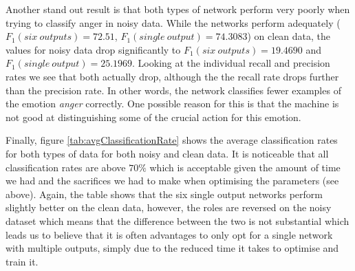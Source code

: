 \documentclass[10pt,a4paper]{article}
\begin{document}
Another stand out result is that both types of network perform very poorly when trying to classify anger in noisy data. While the networks perform adequately ($F_1(six~outputs) = 72.51$, $F_1(single~output) = 74.3083$) on clean data, the values for noisy data drop significantly to $F_1(six~outputs) = 19.4690$ and $F_1(single~output) = 25.1969$. Looking at the individual recall and precision rates we see that both actually drop, although the the recall rate drops further than the precision rate. In other words, the network classifies fewer examples of the emotion \emph{anger} correctly. One possible reason for this is that the machine is not good at distinguishing some of the crucial action for this emotion.

Finally, figure \ref{tab:avgClassificationRate} shows the average classification rates for both types of data for both noisy and clean data. It is noticeable that all classification rates are above $70\%$ which is acceptable given the amount of time we had and the sacrifices we had to make when optimising the parameters (see above). Again, the table shows that the six single output networks perform slightly better on the clean data, however, the roles are reversed on the noisy dataset which means that the difference between the two is not substantial which leads us to believe that it is often advantages to only opt for a single network with multiple outputs, simply due to the reduced time it takes to optimise and train it.
\end{document}

